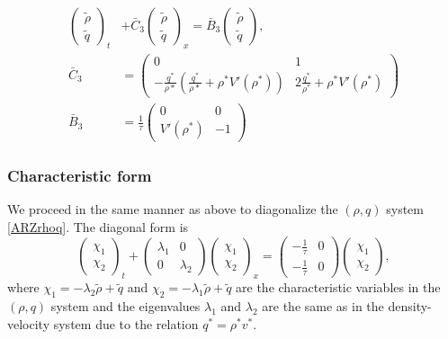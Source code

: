 \documentclass[a4paper, 10pt, conference]{ieeeconf}      %
\begin{document}
\begin{align}
\begin{pmatrix}
	\tilde{\rho} \\
	\tilde{q}
\end{pmatrix}_t
&+ \bar{C}_3
\begin{pmatrix}
	\tilde{\rho} \\ 
	\tilde{q}
\end{pmatrix}_x 
= 
\bar{B}_3
\begin{pmatrix}
	\tilde{\rho} \\
	\tilde{q}
\end{pmatrix}, \\
\bar{C}_3 &=
\begin{pmatrix}
	0 & 1 \\
	-\frac{q^{*}}{\rho{*}} \left(
		\frac{q^{*}}{\rho{*}} + \rho^{*} V'\left( \rho^{*} \right) \right) & 2 \frac{q^{*}}{\rho^{*}} + \rho^{*} V'\left( \rho^{*} \right)
\end{pmatrix} \\
\bar{B}_3 &=
\frac{1}{\tau}
\begin{pmatrix}
	0 & 0 \\
	V'\left( \rho^{*} \right) & -1
\end{pmatrix}
\end{align}

\subsubsection{Characteristic form}
We proceed in the same manner as above to diagonalize the $(\rho,q)$ system \eqref{ARZrhoq}. The diagonal form is
\begin{equation} \label{rhoqlindiag}
\begin{pmatrix}
	\chi_1 \\ 
	\chi_2
\end{pmatrix}_t 
+
\begin{pmatrix}
	\lambda_1 & 0 \\
	0 & \lambda_2
\end{pmatrix}
\begin{pmatrix}
	\chi_1 \\ 
	\chi_2
\end{pmatrix}_x
= 
\begin{pmatrix}
	-\frac{1}{\tau} & 0 \\
	-\frac{1}{\tau} & 0
\end{pmatrix}
\begin{pmatrix}
\chi_1 \\ \chi_2
\end{pmatrix},
\end{equation}
where $\chi_1 = -\lambda_2 \tilde{\rho} + \tilde{q}$ and $\chi_2 = -\lambda_1 \tilde{\rho} + \tilde{q}$ are the characteristic variables in the $(\rho,q)$ system and the eigenvalues $\lambda_1$ and $\lambda_2$ are the same as in the density-velocity system due to the relation $q^* = \rho^*v^*$.
\end{document}
